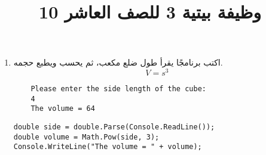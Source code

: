\documentclass[12pt]{article}
\title{وظيفة بيتية 3 للصف العاشر 10}
\begin{document}
\maketitle
\thispagestyle{fancy}

\begin{enumerate}[itemsep=3em]
    \item
    اكتب برنامجًا يقرأ طول ضلع مكعب، ثم يحسب ويطبع حجمه.
    \[
    V = s^3
    \]
    \ifdetailed
    \begin{example}
    \begin{english}
    \begin{lstlisting}
    Please enter the side length of the cube:
    4
    The volume = 64
    \end{lstlisting}
    \end{english}
    \end{example}
    \ifwithsols
    \begin{solution}
    \begin{english}
    \begin{lstlisting}
double side = double.Parse(Console.ReadLine());
double volume = Math.Pow(side, 3);
Console.WriteLine("The volume = " + volume);
    \end{lstlisting}
    \end{english}
    \end{solution}
    \fi
    \fi


\end{enumerate}
\end{document}
